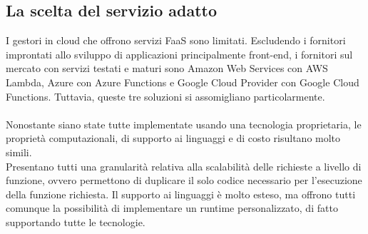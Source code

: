 \subsection{La scelta del servizio adatto}

I gestori in cloud che offrono servizi FaaS sono limitati.
Escludendo i fornitori improntati allo sviluppo di applicazioni principalmente front-end,
i fornitori sul mercato con servizi testati e maturi sono
Amazon Web Services con AWS Lambda, Azure con Azure Functions e Google Cloud Provider con Google Cloud Functions.
Tuttavia, queste tre soluzioni si assomigliano particolarmente.\\
\\
Nonostante siano state tutte implementate usando una tecnologia proprietaria,
le proprietà computazionali, di supporto ai linguaggi e di costo risultano molto simili.\\
Presentano tutti una granularità relativa alla scalabilità delle richieste a livello di funzione,
ovvero permettono di duplicare il solo codice necessario per l'esecuzione della funzione richiesta.
Il supporto ai linguaggi è molto esteso,
ma offrono tutti comunque la possibilità di implementare un runtime personalizzato,
di fatto supportando tutte le tecnologie.\\

